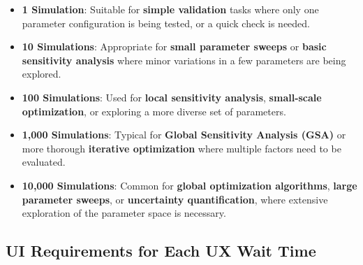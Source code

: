 \documentclass{article}
\begin{document}
\begin{landscape}
\begin{itemize}
    \item \textbf{1 Simulation}: Suitable for \textbf{simple validation} tasks where only one parameter configuration is being tested, or a quick check is needed.
    \item \textbf{10 Simulations}: Appropriate for \textbf{small parameter sweeps} or \textbf{basic sensitivity analysis} where minor variations in a few parameters are being explored.
    \item \textbf{100 Simulations}: Used for \textbf{local sensitivity analysis}, \textbf{small-scale optimization}, or exploring a more diverse set of parameters.
    \item \textbf{1,000 Simulations}: Typical for \textbf{Global Sensitivity Analysis (GSA)} or more thorough \textbf{iterative optimization} where multiple factors need to be evaluated.
    \item \textbf{10,000 Simulations}: Common for \textbf{global optimization algorithms}, \textbf{large parameter sweeps}, or \textbf{uncertainty quantification}, where extensive exploration of the parameter space is necessary.
\end{itemize}

\subsection{UI Requirements for Each UX Wait Time}


\end{landscape}
\end{document}
